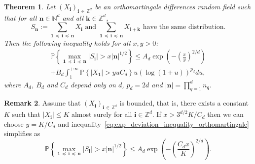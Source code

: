 \documentclass[10pt]{amsart}
\newtheorem{theo}{Theorem}[section]
\theoremstyle{definition}\newtheorem{defi}[theo]{Definition}\newtheorem{rema}[theo]{Remark}\newtheorem{exam}[theo]{Example}\newtheorem{exem}[theo]{Example}\newtheorem{nota}[theo]{Notation}
\newcommand\N{\mathbb{N}}
\newcommand\PP{\mathbb{P}}
\newcommand\Z{\mathbb{Z}}
\newcommand\abs[1]{|#1|}
\newcommand{\pr}[1]{(#1)}
\newcommand{\gr}[1]{\bm{#1}}
\newcommand{\gri}{\bm{i}}
\newcommand{\grn}{\bm{n}}
\newcommand{\grk}{\bm{k}}
\newcommand{\imd}{\preccurlyeq}
\begin{document}
\begin{theo}\label{thm:deviation_inequality_orthomartingale}
Let $\pr{X_{\gri}}_{\gri\,\in\,\Z^d}$ be an orthomartingale differences random field such that for all $\grn\in\N^d$ and all $\grk\in\Z^d$,
\begin{equation}\label{eq:invariance_loi_sommes}
S_{\grn}:=\sum_{\gr{1}\,\imd\,\gri\,\imd\,\grn} X_{\gri}\text{ and } \sum_{\gr{1}\,\imd\,\gri\,\imd\,\grn} X_{\gri+\grk}\text{ have the same distribution}.
\end{equation}
Then the following inequality holds for all $x,y>0$:
\begin{multline}\label{eq:exp_deviation_inequality_orthomartingale}
\PP\left\{\max_{\gr{1}\,\imd\,\gri\,\imd\,\gr{n}} \left|S_{\gri} \right| >x\left|\grn\right|^{1/2}\right\}\leq A_d\exp\left(-\left(\frac{x}{y}\right)^{2/d}\right)
\\+B_d\int_1^{+\infty}\PP\left\{\left|X_{\gr{1}}\right|>yuC_d\right\} u\left(\log\pr{1+u}\right)^{p_d}du,
\end{multline}
where $A_d$, $B_d$ and $C_d$ depend only on $d$, $p_d=2d$ and $\abs{\grn}=\prod_{q=1}^dn_q$.
\end{theo}


\begin{rema}
Assume that $\pr{X_{\gri}}_{\gri\,\in\,\Z^d}$ is bounded, that is, there exists a constant $K$ such that $\abs{X_{\gr{i}}}\leq K$ almost surely for all $\gri\in\Z^d$. If $x>3^{d/2}K/C_d$ then we can choose $y=K/C_d$ and inequality~\eqref{eq:exp_deviation_inequality_orthomartingale} simplifies as
\begin{equation}
\PP\left\{\max_{\gr{1}\,\imd\,\gri\,\imd\,\gr{n}} \left|S_{\gri} \right| >x\left|\grn\right|^{1/2}\right\}\leq A_d\exp\left(-\left(\frac{C_dx}{K}\right)^{2/d}\right).
\end{equation}
\end{rema}
\end{document}
